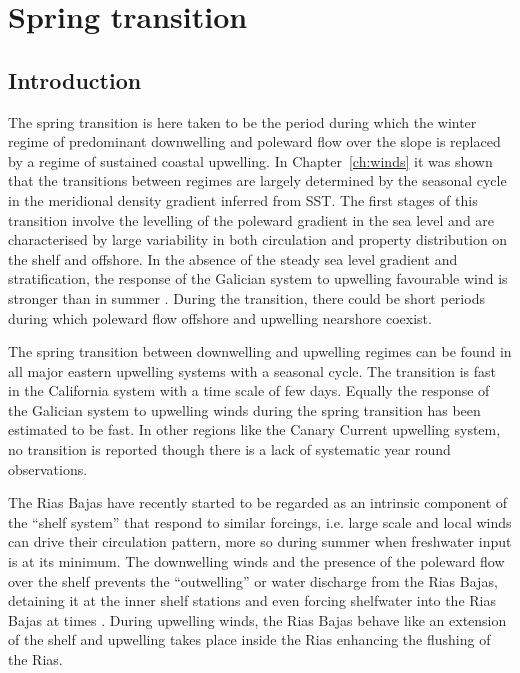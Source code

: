 %
\chapter{Spring transition}\label{ch:spring}
\section{Introduction}
The spring transition is here taken to be the period during which
the winter regime of predominant downwelling and poleward flow
over the slope is replaced by a regime of sustained coastal
upwelling. In Chapter~\ref{ch:winds} it was shown that the
transitions between regimes are largely determined by the seasonal
cycle in the meridional density gradient inferred from SST. The
first stages of this transition involve the levelling of the
poleward gradient in the sea level and are characterised by large
variability in both circulation and property distribution on the
shelf and offshore. In the absence of the steady sea level
gradient and stratification, the response of the Galician system
to upwelling favourable wind is stronger than in summer
\citet{Castro00}. During the transition, there could be short
periods during which poleward flow offshore and upwelling
nearshore coexist.

The spring transition between downwelling and upwelling regimes
can be found in all major eastern upwelling systems with a
seasonal cycle. The transition is fast in the California system
\citep{huyer83} with a time scale of few days. Equally the
response of the Galician system to upwelling winds during the
spring transition has been estimated to be fast. In other regions
like the Canary Current upwelling system, no transition is
reported though there is a lack of systematic year round
observations.

The Rias Bajas have recently started to be regarded as an
intrinsic component of the ``shelf system'' that respond to
similar forcings, i.e. large scale and local winds can drive their
circulation pattern, more so during summer when freshwater input
is at its minimum. The downwelling winds and the presence of the
poleward flow over the shelf prevents the ``outwelling'' or water
discharge from the Rias Bajas, detaining it at the inner shelf
stations \citep{Castro97} and even forcing shelfwater into the
Rias Bajas at times \citep[e.g.][]{Prego01,Sordo01}. During
upwelling winds, the Rias Bajas behave like an extension of the
shelf \citep{Doval98} and upwelling takes place inside the Rias
\citep{Alvarez-Salgado00} enhancing the flushing of the Rias.

